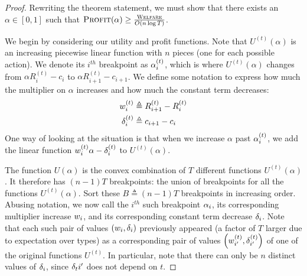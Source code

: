 \documentclass{article}
\newcommand{\Cost}[1]{c_{#1}}
\newcommand{\TypedExpectedReward}[2]{R^{(#1)}_{#2}}
\newcommand{\TransferCoefficient}{\alpha}
\newcommand{\Profit}{\textsc{Profit}}
\newcommand{\Utility}{U}
\newcommand{\OWelfare}{\textsc{Welfare}}
\begin{document}
\begin{proof}
Rewriting the theorem statement, we must show that there exists an $\TransferCoefficient \in [0, 1]$ such that $\Profit(\alpha) \ge \frac{\OWelfare}{O(n\log T)}$.

We begin by considering our utility and profit functions. Note that $\Utility^{(t)}(\TransferCoefficient)$ is an increasing piecewise linear function with $n$ pieces (one for each possible action). We denote its $i^{th}$ breakpoint as $\TypedBreakpoint{t}{i}$, which is where $\Utility^{(t)}(\TransferCoefficient)$ changes from $\TransferCoefficient \TypedExpectedReward{t}{i} - \Cost{i}$ to $\TransferCoefficient \TypedExpectedReward{t}{i+1} - \Cost{i+1}$. We define some notation to express how much the multiplier on $\TransferCoefficient$ increases and how much the constant term decreases:
\begin{align*}
  \TypedCoefficientJump{t}{i} &\triangleq \TypedExpectedReward{t}{i+1} - \TypedExpectedReward{t}{i} \\
  \TypedBiasDrop{t}{i} &\triangleq \Cost{i+1} - \Cost{i}
\end{align*}
One way of looking at the situation is that when we increase $\TransferCoefficient$ past $\TypedBreakpoint{t}{i}$, we add the linear function $\TypedCoefficientJump{t}{i} \TransferCoefficient - \TypedBiasDrop{t}{i}$ to $\Utility^{(t)}(\TransferCoefficient)$.

The function $\Utility(\TransferCoefficient)$ is the convex combination of $T$ different functions $\Utility^{(t)}(\TransferCoefficient)$. It therefore has $(n-1)T$ breakpoints: the union of breakpoints for all the functions $\Utility^{(t)}(\TransferCoefficient)$. Sort these $B \triangleq (n-1)T$ breakpoints in increasing order. Abusing notation, we now call the $i^{th}$ such breakpoint $\Breakpoint{i}$, its corresponding multiplier increase $\CoefficientJump{i}$, and its corresponding constant term decrease $\BiasDrop{i}$. Note that each such pair of values $\left( \CoefficientJump{i}, \BiasDrop{i} \right)$ previously appeared (a factor of $T$ larger due to expectation over types) as a corresponding pair of values $\left( \TypedCoefficientJump{t}{i'}, \TypedBiasDrop{t}{i'} \right)$ of one of the original functions $\Utility^{(t)}$. In particular, note that there can only be $n$ distinct values of $\BiasDrop{i}$, since $\BiasDrop{t}{i'}$ does not depend on $t$.


\end{proof}
\end{document}
